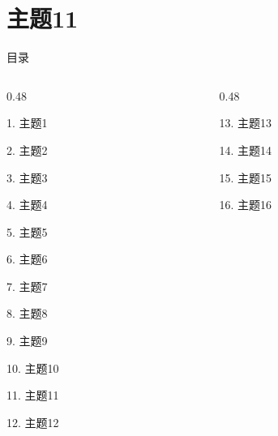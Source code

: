 \documentclass[aspectratio=169,10pt,fontset=fandol]{ctexbeamer}
\begin{document}
\section{主题11}
\begin{frame}[t,fragile]{目录}
\small
\begin{columns}[T,onlytextwidth]
\begin{column}{0.48\textwidth}
{\color{black}\small 1. 主题1\par}\vspace{0.22em}
{\color{black}\small 2. 主题2\par}\vspace{0.22em}
{\color{black}\small 3. 主题3\par}\vspace{0.22em}
{\color{black}\small 4. 主题4\par}\vspace{0.22em}
{\color{black}\small 5. 主题5\par}\vspace{0.22em}
{\color{black}\small 6. 主题6\par}\vspace{0.22em}
{\color{black}\small 7. 主题7\par}\vspace{0.22em}
{\color{black}\small 8. 主题8\par}\vspace{0.22em}
{\color{black}\small 9. 主题9\par}\vspace{0.22em}
{\color{black}\small 10. 主题10\par}\vspace{0.22em}
{\color{blue}\small 11. 主题11\par}\vspace{0.22em}
{\color{gray!40}\small 12. 主题12\par}\vspace{0.22em}
\end{column}
\begin{column}{0.48\textwidth}
{\color{gray!40}\small 13. 主题13\par}\vspace{0.22em}
{\color{gray!40}\small 14. 主题14\par}\vspace{0.22em}
{\color{gray!40}\small 15. 主题15\par}\vspace{0.22em}
{\color{gray!40}\small 16. 主题16\par}\vspace{0.22em}

\end{column}
\end{columns}
\end{frame}
\end{document}
